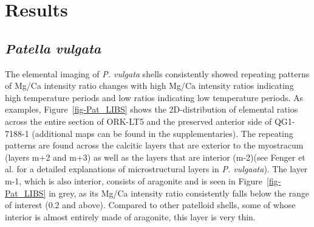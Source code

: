 \documentclass[
  authoryear,
  preprint,
  3p]{elsarticle}
\begin{document}
\section{Results}\label{Results}

\subsection{\texorpdfstring{\emph{Patella
vulgata}}{Patella vulgata}}\label{patella-vulgata}

The elemental imaging of \emph{P. vulgata} shells consistently showed
repeating patterns of Mg/Ca intensity ratio changes with high Mg/Ca
intensity ratios indicating high temperature periods and low ratios
indicating low temperature periods. As examples,
Figure~\ref{fig-Pat_LIBS} shows the 2D-distribution of elemental ratios
across the entire section of ORK-LT5 and the preserved anterior side of
QG1-7188-1 (additional maps can be found in the supplementaries). The
repeating patterns are found across the calcitic layers that are
exterior to the myostracum (layers m+2 and m+3) as well as the layers
that are interior (m-2)(see Fenger et al. \citeyearpar{Fenger2007-gf}
for a detailed explanations of microstructural layers in \emph{P.
vulgaata}). The layer m-1, which is also interior, consists of aragonite
and is seen in Figure~\ref{fig-Pat_LIBS} in grey, as its Mg/Ca intensity
ratio consistently falls below the range of interest (0.2 and above).
Compared to other patelloid shells, some of whose interior is almost
entirely made of aragonite, this layer is very thin. \newline
\end{document}
